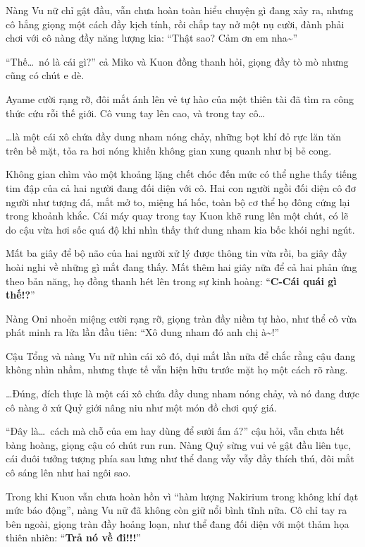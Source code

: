 \documentclass[../main.tex]{subfiles}
\begin{document}
Nàng Vu nữ chỉ gật đầu, vẫn chưa hoàn toàn hiểu chuyện gì đang xảy ra, nhưng cô hắng giọng một cách đầy kịch tính, rồi chắp tay nở một nụ cười, đành phải chơi với cô nàng đầy năng lượng kia: ``Thật sao? Cảm ơn em nha\~{}''

``Thế\dots\ nó là cái gì?'' cả Miko và Kuon đồng thanh hỏi, giọng đầy tò mò nhưng cũng có chút e dè.

Ayame cười rạng rỡ, đôi mắt ánh lên vẻ tự hào của một thiên tài đã tìm ra công thức cứu rỗi thế giới. Cô vung tay lên cao, và trong tay cô\dots

\dots là một cái xô chứa đầy dung nham nóng chảy, những bọt khí đỏ rực lăn tăn trên bề mặt, tỏa ra hơi nóng khiến không gian xung quanh như bị bẻ cong.


Không gian chìm vào một khoảng lặng chết chóc đến mức có thể nghe thấy tiếng tim đập của cả hai người đang đối diện với cô. Hai con người ngồi đối diện cô đơ người như tượng đá, mắt mở to, miệng há hốc, toàn bộ cơ thể họ đông cứng lại trong khoảnh khắc. Cái máy quay trong tay Kuon khẽ rung lên một chút, có lẽ do cậu vừa hơi sốc quá độ khi nhìn thấy thứ dung nham kia bốc khói nghi ngút.

Mất ba giây để bộ não của hai người xử lý được thông tin vừa rồi, ba giây đầy hoài nghi về những gì mắt đang thấy. Mất thêm hai giây nữa để cả hai phản ứng theo bản năng, họ đồng thanh hét lên trong sự kinh hoàng: ``\textbf{C-Cái quái gì thế!?}''

Nàng Oni nhoẻn miệng cười rạng rỡ, giọng tràn đầy niềm tự hào, như thể cô vừa phát minh ra lửa lần đầu tiên: ``Xô dung nham đó anh chị à\~{}!''

Cậu Tổng và nàng Vu nữ nhìn cái xô đó, dụi mắt lần nữa để chắc rằng cậu đang không nhìn nhầm, nhưng thực tế vẫn hiện hữu trước mặt họ một cách rõ ràng.

\dots Đúng, đích thực là một cái xô chứa đầy dung nham nóng chảy, và nó đang được cô nàng ở xứ Quỷ giới nâng niu như một món đồ chơi quý giá.

``Đây là\dots\ cách mà chỗ của em hay dùng để sưởi ấm á?'' cậu hỏi, vẫn chưa hết bàng hoàng, giọng cậu có chút run run. Nàng Quỷ sừng vui vẻ gật đầu liên tục, cái đuôi tưởng tượng phía sau lưng như thể đang vẫy vẫy đầy thích thú, đôi mắt cô sáng lên như hai ngôi sao.

Trong khi Kuon vẫn chưa hoàn hồn vì ``hàm lượng Nakirium trong không khí đạt mức báo động'', nàng Vu nữ đã không còn giữ nổi bình tĩnh nữa. Cô chỉ tay ra bên ngoài, giọng tràn đầy hoảng loạn, như thể đang đối diện với một thảm họa thiên nhiên: ``\textbf{Trả nó về đi!!!}''
\end{document}
